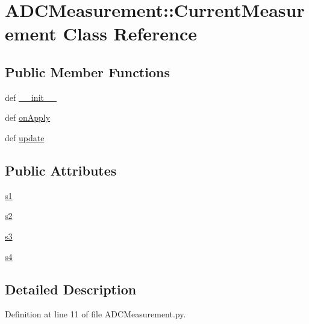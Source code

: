 \hypertarget{classADCMeasurement_1_1CurrentMeasurement}{
\section{ADCMeasurement::CurrentMeasurement Class Reference}
\label{classADCMeasurement_1_1CurrentMeasurement}
}
\subsection*{Public Member Functions}
\begin{DoxyCompactItemize}
\item 
def \hyperlink{classADCMeasurement_1_1CurrentMeasurement_ae173af588de91b26bebbef9b47a7db0c}{\_\-\_\-init\_\-\_\-}
\item 
def \hyperlink{classADCMeasurement_1_1CurrentMeasurement_a7ccea573b2529acbb2899bcc979eed58}{onApply}
\item 
def \hyperlink{classADCMeasurement_1_1CurrentMeasurement_a5a8dbc0c17e6a530458fd18b142416eb}{update}
\end{DoxyCompactItemize}
\subsection*{Public Attributes}
\begin{DoxyCompactItemize}
\item 
\hyperlink{classADCMeasurement_1_1CurrentMeasurement_a4700a5576f637753ef795fbd5418a532}{s1}
\item 
\hyperlink{classADCMeasurement_1_1CurrentMeasurement_a6bbff53922d9b1856c15bc498e398ccd}{s2}
\item 
\hyperlink{classADCMeasurement_1_1CurrentMeasurement_a023e08fd2ab52d3a566a7fe2b5ea4919}{s3}
\item 
\hyperlink{classADCMeasurement_1_1CurrentMeasurement_ad4afef9a3c92f52001ed0f7a935c49a0}{s4}
\end{DoxyCompactItemize}


\subsection{Detailed Description}


Definition at line 11 of file ADCMeasurement.py.

